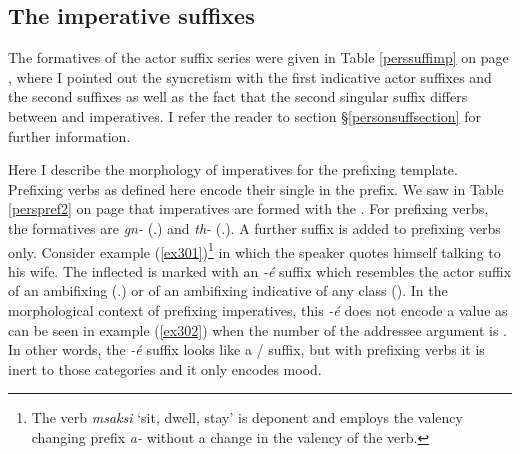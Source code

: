 \subsection{The imperative suffixes}\label{imperativesuffix}

The formatives of the  actor suffix series were given in Table \ref{perssuffimp} on page \pageref{perssuffimp}, where I pointed out the syncretism with the first  indicative actor suffixes and the second   suffixes as well as the fact that the second singular suffix differs between  and  imperatives. I refer the reader to section \S{}\ref{personsuffsection} for further information.%

Here I describe the morphology of imperatives for the prefixing template. Prefixing verbs as defined here encode their single  in the prefix. We saw in Table \ref{perspref2} on page \pageref{perspref2} that imperatives are formed with the \Bet{} . For prefixing verbs, the formatives are \emph{gn-} (\Ssg.\Imp) and \emph{th-} (\Snsg.\Imp). A further suffix is added to prefixing verbs only. Consider example (\ref{ex301})\footnote{The verb \emph{msaksi} `sit, dwell, stay' is deponent and employs the valency changing prefix \emph{a-} without a change in the valency of the verb.} in which the speaker quotes himself talking to his wife. The  inflected  is marked with an \emph{-é} suffix which resembles the actor suffix of an ambifixing   (\Ssg.\Imp) or of an ambifixing indicative of any  class (\Fsg). In the morphological context of prefixing imperatives, this \emph{-é} does not encode a  value as can be seen in example (\ref{ex302}) when the number of the addressee argument is . In other words, the \emph{-é} suffix looks like a / suffix, but with prefixing verbs it is inert to those categories and it only encodes  mood.

